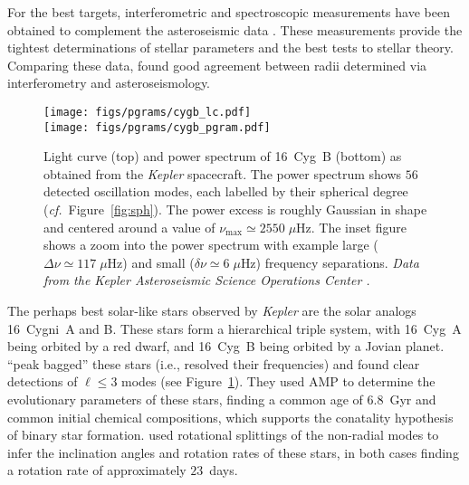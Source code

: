 For the best targets, interferometric and spectroscopic measurements have been obtained to complement the asteroseismic data \citep[e.g.,][]{2010MNRAS.405.1907B, 2012MNRAS.423..122B, 2012ApJ...749..152M, 2013MNRAS.433.1262W}. 
These measurements provide the tightest determinations of stellar parameters and the best tests to stellar theory. 
Comparing these data, \citet{2012ApJ...760...32H} found good agreement between radii determined via interferometry and asteroseismology. 
\begin{figure}
    \centering
    \texttt{[image: figs/pgrams/cygb\_lc.pdf]}\\
    \texttt{[image: figs/pgrams/cygb\_pgram.pdf]}
    \caption[Power spectrum of 16~Cyg~B]{
        Light curve (top) and power spectrum of 16~Cyg~B (bottom) as obtained from the \emph{Kepler} spacecraft. 
        The power spectrum shows $56$ detected oscillation modes, each labelled by their spherical degree (\emph{cf.}~Figure~\ref{fig:sph}). 
        The power excess is roughly Gaussian in shape and centered around a value of ${\nu_{\max}\simeq 2550 \;\mu\text{Hz}}$. 
        The inset figure shows a zoom into the power spectrum with example large (${\Delta\nu \simeq 117\;\mu\text{Hz}}$) and small (${\delta\nu \simeq 6\;\mu\text{Hz}}$) frequency separations. 
        \emph{Data from the Kepler Asteroseismic Science Operations Center \citep{KASOC}.}
    \label{fig:16cygb}}
\end{figure}


The perhaps best solar-like stars observed by \emph{Kepler} are the solar analogs 16~Cygni~A and B. 
These stars form a hierarchical triple system, with 16~Cyg~A being orbited by a red dwarf, and 16~Cyg~B being orbited by a Jovian planet.  %
\citet{2012ApJ...748L..10M} ``peak bagged'' these stars (i.e., resolved their frequencies) and found clear detections of ${\ell\leq 3}$ modes (see Figure~\ref{fig:16cygb}). 
They used AMP to determine the evolutionary parameters of these stars, finding a common age of $6.8$~Gyr and common initial chemical compositions, which supports the conatality hypothesis of binary star formation. 
\citet{2015MNRAS.446.2959D} used rotational splittings of the non-radial modes to infer the inclination angles and rotation rates of these stars, in both cases finding a rotation rate of approximately $23$~days. 


